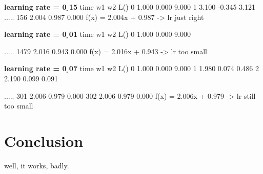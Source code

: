 \documentclass{article}
\begin{document}
\textbf{learning rate = 0 ̣15}
time    w1      w2      L()
0       1.000   0.000   9.000
1       3.100   -0.345  3.121
.....
156     2.004   0.987   0.000
f(x) = 2.004x + 0.987
-> lr just right

\textbf{learning rate = 0 ̣01}
time    w1      w2      L()
0       1.000   0.000   9.000

.....
1479    2.016   0.943   0.000
f(x) = 2.016x + 0.943
-> lr too small

\textbf{learning rate = 0 ̣07}
time    w1      w2      L()
0       1.000   0.000   9.000
1       1.980   0.074   0.486
2       2.190   0.099   0.091

.....
301     2.006   0.979   0.000
302     2.006   0.979   0.000
f(x) = 2.006x + 0.979
-> lr still too small


\section{Conclusion}
well, it works, badly.
\end{document}
